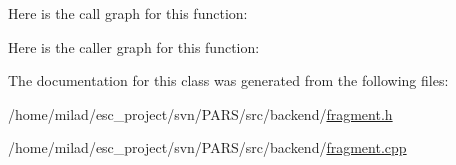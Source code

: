 Here is the call graph for this function:




Here is the caller graph for this function:




The documentation for this class was generated from the following files:\begin{DoxyCompactItemize}
\item 
/home/milad/esc\_\-project/svn/PARS/src/backend/\hyperlink{fragment_8h}{fragment.h}\item 
/home/milad/esc\_\-project/svn/PARS/src/backend/\hyperlink{fragment_8cpp}{fragment.cpp}\end{DoxyCompactItemize}
